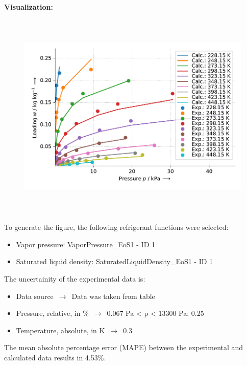 \textbf{Visualization:}
%
\begin{figure}[!htp]
{\noindent\includegraphics[height=10cm, keepaspectratio]{figs/ads/ads_CarbonDioxide_zeolite_pellet_13X_Toth_1.pdf}}
\end{figure}
%

To generate the figure, the following refrigerant functions were selected:
\begin{itemize}
\item Vapor pressure: VaporPressure\_EoS1 - ID 1
\item Saturated liquid density: SaturatedLiquidDensity\_EoS1 - ID 1
\end{itemize}

The uncertainity of the experimental data is:
\begin{itemize}
\item Data source $\,\to\,$ Data was taken from table
\item Pressure, relative, in \% $\,\to\,$ 0.067 Pa < p < 13300 Pa: 0.25%
\item Temperature, absolute, in $\si{\kelvin}$ $\,\to\,$ 0.3
\end{itemize}

The mean absolute percentage error (MAPE) between the experimental and calculated data results in 4.53\%.
\FloatBarrier
\newpage
